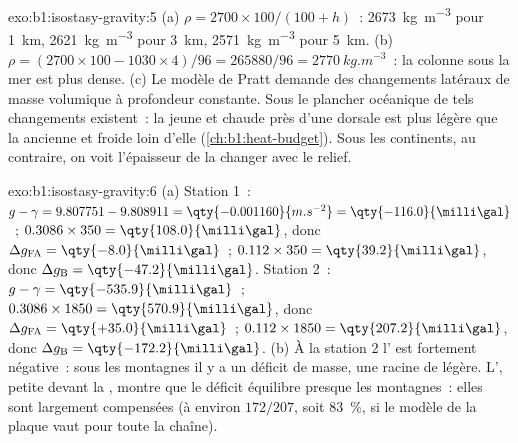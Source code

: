 \begin{solution}{exo:b1:isostasy-gravity:5}
(a) $\rho = 2700\times100/(100 + h)$~: \qty{2673}{kg.m^{-3}} pour \qty{1}{km},
\qty{2621}{kg.m^{-3}} pour \qty{3}{km}, \qty{2571}{kg.m^{-3}} pour \qty{5}{km}.
(b) $\rho = (2700\times100 - 1030\times4)/96 = \num{265880}/96 =
\qty{2770}{kg.m^{-3}}$~: la colonne sous la mer est plus dense. (c) Le modèle de Pratt
demande des changements latéraux de masse volumique à profondeur constante. Sous le
plancher océanique de tels changements existent~: la  jeune et chaude près
d'une dorsale est plus légère que la  ancienne et froide loin d'elle
(\cref{ch:b1:heat-budget}). Sous les continents, au contraire, on voit l'épaisseur de
la  changer avec le relief.
\end{solution}

\begin{solution}{exo:b1:isostasy-gravity:6}
(a) Station 1~: $g - \gamma = 9.807751 - 9.808911 = \qty{-0.001160}{m.s^{-2}} =
\qty{-116.0}{\milli\gal}$~;  $0.3086\times350 =
\qty{108.0}{\milli\gal}$, donc $\Delta g_{\mathrm{FA}} = \qty{-8.0}{\milli\gal}$~;
 $0.112\times350 = \qty{39.2}{\milli\gal}$, donc
$\Delta g_{\mathrm B} = \qty{-47.2}{\milli\gal}$.
Station 2~: $g - \gamma = \qty{-535.9}{\milli\gal}$~; 
$0.3086\times1850 = \qty{570.9}{\milli\gal}$, donc $\Delta g_{\mathrm{FA}} =
\qty{+35.0}{\milli\gal}$~;  $0.112\times1850 =
\qty{207.2}{\milli\gal}$, donc $\Delta g_{\mathrm B} = \qty{-172.2}{\milli\gal}$.
(b) À la station 2 l' est fortement négative~: sous les montagnes
il y a un déficit de masse, une racine de  légère. L', petite
devant la , montre que le déficit équilibre presque
les montagnes~: elles sont largement compensées (à environ $172/207$, soit
\qty{83}{\percent}, si le modèle de la plaque vaut pour toute la chaîne).
\end{solution}

